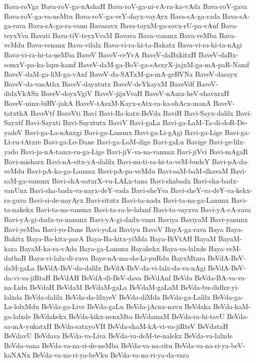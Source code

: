 {Bava-roVga
Bava-roV-ga-nAshaH
Bava-roV-ga-ni-vA-ra-ka-vAda
Bava-roV-gava
Bava-roV-ga-va-neMtu
Bava-roV-ga-veY-dayx-vayAyx
Bava-sA-ga-rada
Bava-sA-ga-rava
Bava-sA-ga-ra-vanu
Bavasavx
Bava-tayxM-ga-savx-rU-pa-vAnf
Bava-teyxVva
Bavati
Bava-tiV-teyxVvaM
Bavava
Bava-vanunx
Bava-veMba
Bava-veMdu
Bava-venanx
Bava-vilalx
Bava-vi-ra-hi-ta-Bakatx
Bava-vi-ra-hi-ta-nAgi
Bava-vi-ra-hi-ta-neMba
BaveV
BaveV-ceYvA
BaveV-daBxkitxH
BaveV-daBx-somxV-pa-ka-lapx-kamf
BaveV-daM-ga-BoV-ga-sAsxyX-jajxM-ga-mA-paR-Namf
BaveV-daM-ga-liM-ga-vAnf
BaveV-da-SATxM-ga-mA-geRVNa
BaveV-dasayx
BaveV-da-vasAthx
BaveV-dayxtutx
BaveV-deYkayxM
BaveVdf
BaveV-didxVkASx
BaveV-doyxVgiV
BaveV-jijxVvaH
BaveV-nAmx-heV-shavxraH
BaveV-ninx-biRV-jakA
BaveV-tAsxM-Kayx-sAtx-ra-ka-shAcx-manA
BaveV-tatxthA
BaveVtf
BaveVti
Bavi
Bavi-Ba-katx-BeVda
BaviH
Bavi-Sayx-dalilx
Bavi-Sayxtf
Bavi-Sayxti
Bavi-Sayxtutx
BaviV
Bavi-gaLa
Bavi-ga-LaM-Ta-di-doR-De-yadeV
Bavi-ga-La-nAnxgi
Bavi-ga-Lanunx
Bavi-ga-Li-gAgi
Bavi-ga-Lige
Bavi-ga-Li-ru-tAtxre
Bavi-ga-Lo-Dane
Bavi-ga-LoM-dige
Bavi-gaLu
Bavige
Bavi-ge-lilx-yado
Bavi-ja-nA-tamx-ru-ga-Lige
Bavi-jiV-va-na-vanunx
Bavi-jiVvi
Bavi-mAgaR
Bavi-misharx
Bavi-nA-sitx-yA-dalilx
Bavi-nu-ti-ra-hi-ta-veM-budeY
Bavi-pA-da-veMdu
Bavi-pA-ka-ga-Lanunx
Bavi-pA-pa-veMdu
Bavi-saM-baM-dhavaM
Bavi-saM-ga-vanunx
Bavi-shA-satxrX-vu-LALx-tana
Bavi-shabadx
Bavi-sha-badx-vanUnx
Bavi-sha-badx-va-nayx-deY-vada
Bavi-sheYva
Bavi-sheY-va-deY-va-kekx-ra-guva
Bavi-si-de-nayAyx
Bavi-situtx
Bavi-ta-nada
Bavi-ta-na-ga-Lanunx
Bavi-ta-nakekx
Bavi-ta-na-vanunx
Bavi-ta-ra-le-lalxnf
Bavi-ta-vayxva
Bavi-yA-cA-rava
Bavi-yA-gi-dadx-va-nanunx
Bavi-yA-gi-dadx-vanu
Baviya
BaviyaM
Bavi-yanunx
Bavi-yeMba
Bavi-yo-Dane
Bavi-yoLu
Baviyu
BavoV
BayA-ga-rava
Baya
Baya-Bakitx
Baya-Ba-kitx-parA
Baya-Ba-kitx-yiMda
Baya-BiVtAH
BayaM
BayaM-kara
BayaM-ka-ra-vAda
Baya-ga-Lanunx
Bayakekx
Baya-va-lalxde
Baya-veM-dathaR
Baya-vi-lalx-di-ruva
Baye-nA-ma-do-Li-puRdu
BayxMtara
BeVdA-BeV-daM-gaLa
BeVdA-BeV-da-dalilx
BeVdA-BeV-da-vi-lalx-da-va-nAgi
BeVdA-BeV-da-vi-va-jiRtaH
BeVdAH
BeVdA-di-BeV-dava
BeVdAnf
BeVda
BeVda-BA-va-va-na-Lidu
BeVdaH
BeVdaM
BeVdaM-gaLa
BeVdaM-gaLaM
BeVda-bu-didhx-yi-lalxda
BeVda-dalilx
BeVda-da-lilxyeV
BeVda-diMda
BeVda-ga-Lalilx
BeVda-ga-La-lolxMdu
BeVda-ga-Live
BeVda-gaLu
BeVda-jAcnx-navu
BeVdaka
BeVda-kaM-ga-lalxde
BeVdakekx
BeVda-kikx-nenxMto
BeVdamaM
BeVda-ra-hi-tavU
BeVda-sa-mA-yukatxH
BeVda-satxyoVH
BeVda-shaM-kA-vi-va-jiRteV
BeVdataH
BeVdavU
BeVdava
BeVda-va-Liva
BeVda-va-deM-te-nalekx
BeVda-va-lalxde
BeVda-vana
BeVda-va-na-ri-de-neMba
BeVda-va-na-ritu
BeVda-va-na-ri-ya-beV-kaNANx
BeVda-va-na-ri-ya-beVku
BeVda-va-na-ri-ya-da-vara
}
